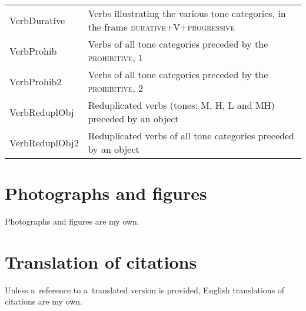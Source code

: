 \begin{refsection}
\begin{table}[H]
  {\renewcommand{\arraystretch}{1.35}
    \begin{tabularx}{\textwidth}{ @{}l Q }
		VerbDurative & Verbs illustrating the various tone categories, in the frame \textsc{durative}+V+\textsc{progressive}\\
		VerbProhib & Verbs of all tone categories preceded by the
      \textsc{prohibitive}, 1\\
		VerbProhib2 & Verbs of all tone categories preceded by the \textsc{prohibitive}, 2\\
		VerbReduplObj & Reduplicated verbs (tones: M, H, L and MH) preceded by an object\\
		VerbReduplObj2 & Reduplicated verbs of all tone categories preceded by an object\\
      \end{tabularx}}
	\end{table}



\section*{Photographs and figures}
\label{sec:images}

Photographs and figures are my own. 

\section*{Translation of citations}
\label{sec:translofcit}

Unless a~reference to a~translated version is provided, English translations of citations are my own. 

\end{refsection}